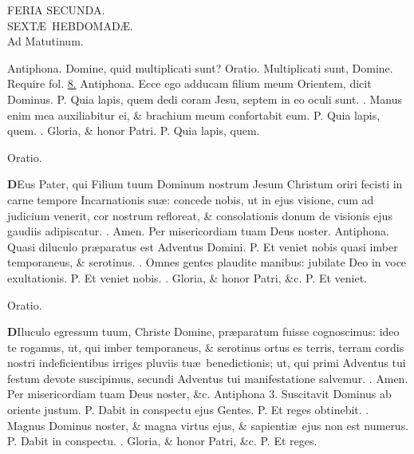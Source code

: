 \documentclass[letter,11pt]{book}
\makeatletter
\DeclareRobustCommand{\Vbar}{\vers@resp{-0.1em}{V}}
\DeclareRobustCommand{\Rbar}{\vers@resp{0pt}{R}}
\newcommand{\vers@resp@sym}{\raisebox{0.2ex}{\rotatebox[origin=c]{-20}{$\m@th\rceil$}}}
\newcommand{\vers@resp}[2]{%
  {\ooalign{\hidewidth\kern#1\vers@resp@sym\hidewidth\cr#2\cr}}%
}%
\def\P{\color{Red} P. \color{black}}
\def\V{\color{Red} \Vbar . \color{black}}
\def\R{\color{Red} \Rbar . \color{black}}
\makeatother
\begin{document}
\begin{multicols}{2}
\begin{center}
FERIA SECUNDA.\\
\color{black} SEXT\AE \ HEBDOMAD\AE .\\
\color{Red} Ad Matutinum.
\end{center}
\vspace{-.75em}
\par \noindent \color{Red} Antiphona. \color{black} Domine, quid multiplicati sunt? \color{Red} Oratio. \color{black} Multiplicati sunt, Domine. \color{Red} Require fol. \color{black} \hyperlink{MON-PRIMA-ADV-MAT}{8.}
\newline \color{Red} Antiphona. \color{black} Ecce ego adducam filium meum Orientem, dicit Dominus. \P Quia lapis, quem dedi coram Jesu, septem in eo oculi sunt. \V Manus enim mea auxiliabitur ei, \& brachium meum confortabit eum. \P Quia lapis, quem. \V Gloria, \& honor Patri. \P Quia lapis, quem.
\vspace{-.5em} \begin{center} \color{Red} Oratio. \color{black} \end{center} \vspace{-.5em}
\lettrine[lines=2]{\bfseries \color{Red} D}{}Eus Pater, qui Filium tuum Dominum nostrum Jesum Christum oriri fecisti in carne tempore Incarnationis su\ae : concede nobis, ut in ejus visione, cum ad judicium venerit, cor nostrum refloreat, \& consolationis donum de visionis ejus gaudiis adipiscatur. \R Amen. Per misericordiam tuam Deus noster.
\newline \color{Red} Antiphona. \color{black} Quasi diluculo pr\ae paratus est Adventus Domini. \P Et veniet nobis quasi imber temporaneus, \& serotinus. \V Omnes gentes plaudite manibus: jubilate Deo in voce exultationis. \P Et veniet nobis. \V Gloria, \& honor Patri, \&c. \P Et veniet.
\vspace{-.5em} \begin{center} \color{Red} Oratio. \color{black} \end{center} \vspace{-.5em}
\lettrine[lines=2]{\bfseries \color{Red} D}{}Iluculo egressum tuum, Christe Domine, pr\ae paratum fuisse cognoscimus: ideo te rogamus, ut, qui imber temporaneus, \& serotinus ortus es terris, terram cordis nostri indeficientibus irriges pluviis tu\ae \ benedictionis; ut, qui primi Adventus tui festum devote suscipimus, secundi Adventus tui manifestatione salvemur. \R Amen. Per misericordiam tuam Deus noster, \&c.
\newline \color{Red} Antiphona 3. \color{black} Suscitavit Dominus ab oriente justum. \P Dabit in conspectu ejus Gentes. \P Et reges obtinebit. \V Magnus Dominus noster, \& magna virtus ejus, \& sapienti\ae \ ejus non est numerus. \P Dabit in conspectu. \V Gloria, \& honor Patri, \&c. \P Et reges.

\end{multicols}
\end{document}

